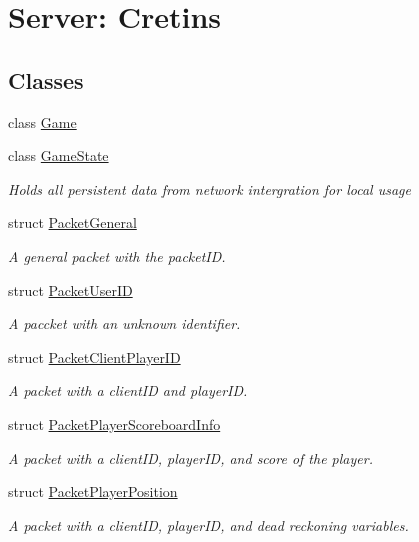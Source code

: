 \hypertarget{group__server}{\section{Server\-: Cretins}
\label{group__server}
}
\subsection*{Classes}
\begin{DoxyCompactItemize}
\item 
class \hyperlink{class_game}{Game}
\item 
class \hyperlink{class_game_state}{Game\-State}
\begin{DoxyCompactList}\small\item\em Holds all persistent data from network intergration for local usage \end{DoxyCompactList}\item 
struct \hyperlink{struct_packet_general}{Packet\-General}
\begin{DoxyCompactList}\small\item\em A general packet with the packet\-I\-D. \end{DoxyCompactList}\item 
struct \hyperlink{struct_packet_user_i_d}{Packet\-User\-I\-D}
\begin{DoxyCompactList}\small\item\em A paccket with an unknown identifier. \end{DoxyCompactList}\item 
struct \hyperlink{struct_packet_client_player_i_d}{Packet\-Client\-Player\-I\-D}
\begin{DoxyCompactList}\small\item\em A packet with a client\-I\-D and player\-I\-D. \end{DoxyCompactList}\item 
struct \hyperlink{struct_packet_player_scoreboard_info}{Packet\-Player\-Scoreboard\-Info}
\begin{DoxyCompactList}\small\item\em A packet with a client\-I\-D, player\-I\-D, and score of the player. \end{DoxyCompactList}\item 
struct \hyperlink{struct_packet_player_position}{Packet\-Player\-Position}
\begin{DoxyCompactList}\small\item\em A packet with a client\-I\-D, player\-I\-D, and dead reckoning variables. \end{DoxyCompactList}\item 

\end{DoxyCompactItemize}
